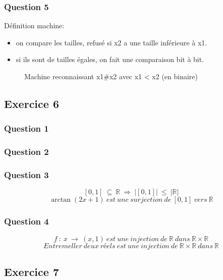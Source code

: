 \subsubsection{Question 5}

Définition machine:
\begin{itemize}
  \item on compare les tailles, refusé si x2 a une taille inférieure à x1.
  \item si ils sont de tailles égales, on fait une comparaison bit à bit.
\end{itemize}

\begin{figure}[ht]
  \centering
  \caption{Machine reconnaissant x1\#x2 avec x1 < x2 (en binaire)}
\end{figure}
\newpage

\subsection{Exercice 6}

\subsubsection{Question 1}

\subsubsection{Question 2}

\subsubsection{Question 3}

$$[0,1]~\subseteq~\mathbb{R}~\Rightarrow~|[0,1]|~\leq~|\mathbb{R}|$$
$$\arctan(2x+1)~est~une~surjection~de~[0,1]~vers~\mathbb{R}$$

\subsubsection{Question 4}

$$f~:~x~\rightarrow~(x,1)~est~une~injection~de~\mathbb{R}~dans~\mathbb{R}\times\mathbb{R}$$
$$Entremeller~deux~réels~est~une~injection~de~\mathbb{R}\times\mathbb{R}~dans~\mathbb{R}$$

\subsection{Exercice 7}

